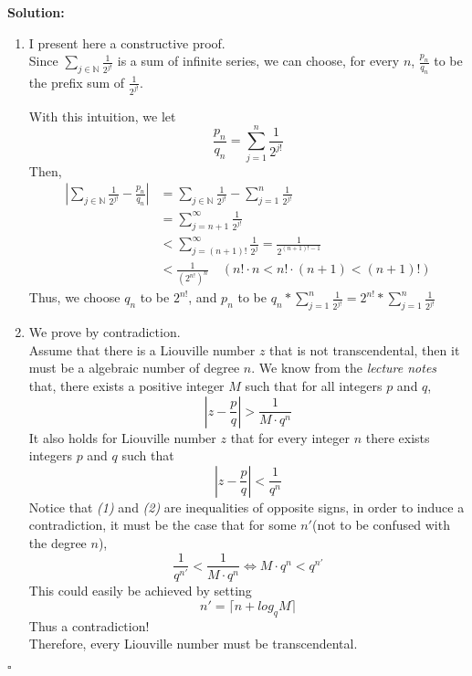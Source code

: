 \documentclass[UTF8, 12pt]{ctexart}
\newenvironment{solution}{\noindent\ignorespaces\textbf{Solution:}}{\hfill $\square$\par\noindent}
\begin{document}
    \begin{solution}
        \begin{enumerate}[label=\arabic*)]
            \item I present here a constructive proof. \\
                Since  $\sum_{j\in\mathbb{N}}\frac{1}{2^{j!}}$ is a sum of infinite series, we can choose, for every $n$, $\frac{p_n}{q_n}$ to be the prefix sum of $\frac{1}{2^{j!}}$. \par
                With this intuition, we let $$ \frac{p_n}{q_n} = \sum_{j = 1}^{n}\frac{1}{2^{j!}} $$
                Then, 
                \begin{align*}
                    |\sum_{j\in\mathbb{N}}\frac{1}{2^{j!}} - \frac{p_n}{q_n}| &= \sum_{j\in\mathbb{N}}\frac{1}{2^{j!}} - \sum_{j = 1}^{n}\frac{1}{2^{j!}} \\
                    &= \sum_{j = n + 1}^{\infty} \frac{1}{2^{j!}} \\
                    &< \sum_{j = (n + 1)!}^{\infty} \frac{1}{2^{j}} = \frac{1}{2^{(n+1)!-1}} \\
                    &< \frac{1}{(2^{n!})^n}\quad (n!\cdot n < n! \cdot (n+1) < (n+1)!)
                \end{align*}
                Thus, we choose $q_n$ to be $2^{n!}$, and $p_n$ to be $q_n * \sum_{j = 1}^{n}\frac{1}{2^{j!}} = 2^{n!} * \sum_{j = 1}^{n}\frac{1}{2^{j!}}$
            \item We prove by contradiction. \\
                Assume that there is a Liouville number $z$ that is not transcendental, then it must be a algebraic number of degree $n$.
                We know from the \textit{lecture notes} that, there exists a positive integer $M$ such that for all integers $p$ and $q$, 
                \begin{equation}
                |z - \frac{p}{q}| > \frac{1}{M\cdot q^n}
                \end{equation}
                It also holds for Liouville number $z$ that for every integer $n$ there exists integers $p$ and $q$ such that
                \begin{equation}
                |z - \frac{p}{q}| < \frac{1}{q^n}
                \end{equation}
                Notice that \textit{(1)} and \textit{(2)} are inequalities of opposite signs, in order to induce a contradiction, it must be the case that
                for some $n'$(not to be confused with the degree $n$),
                $$
                \frac{1}{q^{n'}} < \frac{1}{M\cdot q^n} \Longleftrightarrow M\cdot q^n < q^{n'}
                $$
                This could easily be achieved by setting
                $$
                n' = \lceil n + log_qM\rceil
                $$
                Thus a contradiction! \\ 
                Therefore, every Liouville number must be transcendental.
        \end{enumerate}
    \end{solution}
\end{document}
